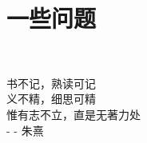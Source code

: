 \chapter{一些问题}
\thispagestyle{fancy}


~\\[9cm]
\begin{flushright}
\kai\xiaosi
\textcolor[rgb]{0.00,0.50,0.00}{
书不记，熟读可记\\ 义不精，细思可精\\
惟有志不立，直是无著力处\\
- - 朱熹
}
\end{flushright}














